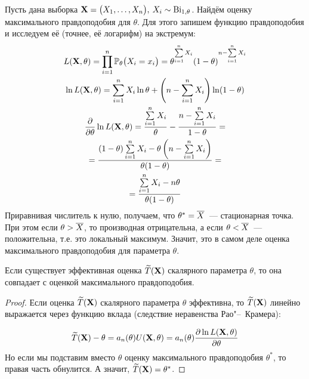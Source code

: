 \begin{exmp}
    Пусть дана выборка $\mathbf{X}= \bigl(X_1, \ldots, X_n \bigr), \: X_i \sim \operatorname{\mathrm{Bi}}_{1, \theta}$.
    Найдём оценку максимального правдоподобия для $\theta$.
    Для этого запишем функцию правдоподобия и исследуем её (точнее, её логарифм) на экстремум:
    \begin{gather*}
        L(\mathbf{X}, \theta) = \prod\limits_{i = 1}^{n} \operatorname{\operatorname{\mathbb{P}}_{\theta}}\bigl(X_i = x_i\bigr)= \theta^{\sum\limits_{i=1}^{n} X_i} (1 - \theta)^{n - \sum\limits_{i=1}^{n} X_i} \\
        \ln L(\mathbf{X}, \theta) = \sum\limits_{i=1}^{n} X_i \ln \theta + \left(n - \sum\limits_{i=1}^{n} X_i\right) \ln(1 - \theta) \\
        \frac{\partial}{\partial \theta} \ln L(\mathbf{X}, \theta) = \frac{\sum\limits_{i=1}^{n} X_i}{\theta} - \frac{n - \sum\limits_{i=1}^{n} X_i}{1 - \theta} = \\
        = \frac{(1 - \theta)\sum\limits_{i=1}^{n} X_i - \theta\left(n - \sum\limits_{i=1}^{n} X_i\right)}{\theta (1 - \theta)} = \\
        = \frac{\sum\limits_{i=1}^{n} X_i - n\theta}{\theta(1 - \theta)}
    \end{gather*}
    Приравнивая числитель к нулю, получаем, что $\theta^{*} = \overline{X}$~--- стационарная точка.
    При этом если $\theta > \overline{X}$, то производная отрицательна, а если $\theta < \overline{X}$~--- положительна, т.е. это локальный максимум.
    Значит, это в самом деле оценка максимального правдоподобия для параметра $\theta$.
\end{exmp}

\begin{thm*}
    Если существует эффективная оценка $\widetilde{T}(\mathbf{X})$ скалярного параметра $\theta$, то она совпадает с оценкой максимального правдоподобия.
\end{thm*}

\begin{proof}
    Если оценка $\widetilde{T}(\mathbf{X})$ скалярного параметра $\theta$ эффективна, то $\widetilde{T}(\mathbf{X})$ линейно выражается через функцию вклада (следствие неравенства Рао"--~Крамера):

    \begin{gather*}
        \widetilde{T}(\mathbf{X}) - \theta = a_n(\theta) U(\mathbf{X}, \theta) = a_n(\theta) \frac{\partial \ln L(\mathbf{X}, \theta)}{\partial \theta}
    \end{gather*}
    Но если мы подставим вместо $\theta$ оценку максимального правдоподобия $\theta^{*}$, то правая часть обнулится.
    А значит, $\widetilde{T}(\mathbf{X}) = \theta^{*}$.
\end{proof}

